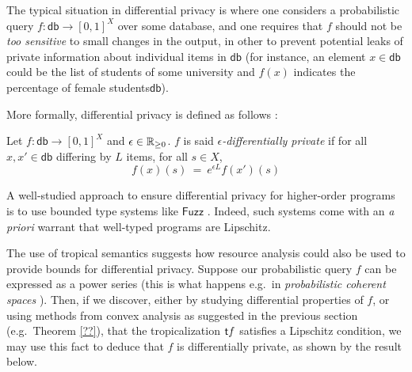 The typical situation in differential privacy is where one considers a probabilistic query $f: \mathsf{db}\to [0,1]^{X}$ over some database, and one requires that $f$ should not be \emph{too sensitive} to small changes in the output, in other to prevent potential leaks of private information about individual items in $\mathsf{db}$ (for instance, an element $x\in\mathsf{db}$ could be the list of students of some university and $f(x)$ indicates the percentage of female students$\mathsf{db}$).

More formally, differential privacy is defined as follows \cite{}:
\begin{definition}
Let $f: \mathsf{db}\to [0,1]^{X}$ and $\epsilon \in \mathbb{R}_{\geq 0}$. $f$ is said \emph{$\epsilon$-differentially private} if for all $x,x'\in \mathsf{db}$
differing by $L$ items, for all $s\in X$, 
$$
f(x)(s) \ = \ e^{\epsilon L} f(x')(s)
$$
\end{definition}

A well-studied approach to ensure differential privacy for higher-order programs is to use bounded type systems like $\mathsf{Fuzz}$ \cite{}. Indeed, such systems come with an \emph{a priori} warrant that well-typed programs are Lipschitz.

The use of tropical semantics suggests how resource analysis could also be used to provide bounds for differential privacy. 
Suppose our probabilistic query $f$ can be expressed as a power series (this is what happens e.g.~in \emph{probabilistic coherent spaces} \cite{}). Then, if we discover, either by studying differential properties of $f$, or using methods from convex analysis as suggested in the previous section (e.g.~Theorem \ref{??}), 
 that the tropicalization $\mathsf{t} f$ satisfies a Lipschitz condition, we may use this fact to deduce that $f$ is differentially private, as shown by the result below.

